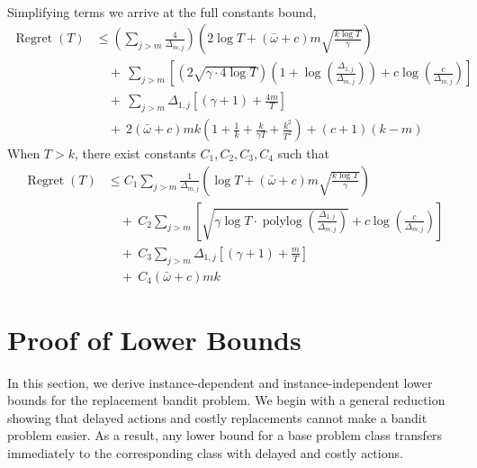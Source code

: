 \documentclass[opre,blindrev]{informs3}
\newcommand{\polylog}{\operatorname{polylog}}
\newcommand{\Regret}{\operatorname{Regret}}
\begin{document}
\begin{APPENDICES}
\begin{align*}
    \end{align*}
    Simplifying terms we arrive at the full constants bound,
    \begin{align*}
        \Regret(T)&\leq \left(\sum_{j>m}\frac{4}{\Delta_{m,j}}\right) \left( 2\log T+(\bar{\omega}+c)m\sqrt{\frac{k\log T}{\gamma }}\right)\\
        &\quad +~ \sum_{j>m} \left[\left(2\sqrt{\gamma \cdot 4\log T}\right)\left(1+\log\left(\frac{\Delta_{1,j}}{\Delta_{m,j}}\right)\right)+c\log\left(\frac{c}{\Delta_{m,j}}\right)\right]\\
        & \quad + ~\sum_{j>m} \Delta_{1,j} \left[(\gamma + 1) + \frac{4m}{T}\right]\\
        &\quad +~2(\bar{\omega}+c)mk\left(1+\frac{1}{k}+\frac{k}{\gamma T}+\frac{k^2}{T^2}\right) + (c+1)(k-m)
    \end{align*}
    When \(T>k\), there exist constants \(C_1, C_2, C_3, C_4\) such that
    \begin{align*}
        \Regret(T)&\leq C_1\sum_{j>m}\frac{1}{\Delta_{m,j}} \left( \log T+(\bar{\omega}+c)m\sqrt{\frac{k\log T}{\gamma }}\right)\\
        &\quad +~ C_2\sum_{j>m} \left[\sqrt{\gamma \log T\cdot \polylog\left(\frac{\Delta_{1,j}}{\Delta_{m,j}}\right)}+c\log\left(\frac{c}{\Delta_{m,j}}\right)\right]\\
        & \quad + ~C_3\sum_{j>m} \Delta_{1,j} \left[(\gamma + 1) + \frac{m}{T}\right]\\
        &\quad +~C_4(\bar{\omega}+c)mk
    \end{align*}
\Halmos


\section{Proof of Lower Bounds}\label{sec:lower_bounds}
In this section, we derive instance-dependent and instance-independent lower bounds for the replacement bandit problem. We begin with a general reduction showing that delayed actions and costly replacements cannot make a bandit problem easier. As a result, any lower bound for a base problem class transfers immediately to the corresponding class with delayed and costly actions.


\end{APPENDICES}
\end{document}
